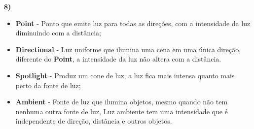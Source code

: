 \textbf{8)} 

\begin{itemize}
    \item \textbf{Point} - Ponto que emite luz para todas as direções, com a intensidade 
    da luz diminuindo com a distância;
    \item \textbf{Directional} - Luz uniforme que ilumina uma cena em uma 
    única direção, diferente do \textbf{Point}, a intensidade da luz não altera com a distância. 
    \item \textbf{Spotlight} - Produz um cone de luz, a luz fica mais intensa quanto mais perto 
    da fonte de luz;
    \item \textbf{Ambient} - Fonte de luz que ilumina objetos, mesmo quando não tem nenhuma outra fonte 
    de luz, Luz ambiente tem uma intensidade que é independente de direção, distância e outros objetos.
\end{itemize}


